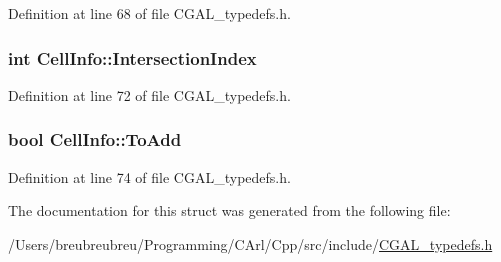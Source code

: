 Definition at line 68 of file C\+G\+A\+L\+\_\+typedefs.\+h.

\hypertarget{struct_cell_info_a3e2aef19e88dfd6fd1b9ecdb78e0e425}{}
\subsubsection[{Intersection\+Index}]{\setlength{\rightskip}{0pt plus 5cm}int Cell\+Info\+::\+Intersection\+Index}\label{struct_cell_info_a3e2aef19e88dfd6fd1b9ecdb78e0e425}


Definition at line 72 of file C\+G\+A\+L\+\_\+typedefs.\+h.

\hypertarget{struct_cell_info_aa1195689286f14121cad231892aa361e}{}
\subsubsection[{To\+Add}]{\setlength{\rightskip}{0pt plus 5cm}bool Cell\+Info\+::\+To\+Add}\label{struct_cell_info_aa1195689286f14121cad231892aa361e}


Definition at line 74 of file C\+G\+A\+L\+\_\+typedefs.\+h.



The documentation for this struct was generated from the following file\+:\begin{DoxyCompactItemize}
\item 
/\+Users/breubreubreu/\+Programming/\+C\+Arl/\+Cpp/src/include/\hyperlink{_c_g_a_l__typedefs_8h}{C\+G\+A\+L\+\_\+typedefs.\+h}\end{DoxyCompactItemize}
